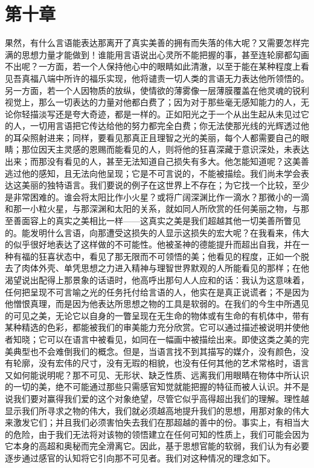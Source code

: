 
\section{第十章}

果然，有什么言语能表达那离开了真实美善的拥有而失落的伟大呢？又需要怎样完满的思想力量才能做到！谁能用言语说出心灵所不能把握的事，甚至连轮廓都勾画不出呢？一方面，若一个人保持他心中的眼睛如此清澈，以至于能在某种程度上看见吾真福八端中所许的福乐实现，他将谴责一切人类的言语无力表达他所领悟的。另一方面，若一个人因物质的放纵，使情欲的薄雾像一层薄膜覆盖在他灵魂的锐利视觉上，那么一切表达的力量对他都白费了；因为对于那些毫无感知能力的人，无论你轻描淡写还是夸大奇迹，都是一样的。正如阳光之于一个从出生起从未见过它的人，一切用言语把它传达给他的努力都完全白费；你无法使那光线的光辉透过他的耳朵照射进来；同样，要看见那真正且理智之光的美丽，每个人都需要自己的眼睛；那位因天主灵感的恩赐而能看见的人，则将他的狂喜深藏于意识深处，未表达出来；而那没有看见的人，甚至无法知道自己损失有多大。他怎能知道呢？这美善逃过他的感知，且无法向他呈现；它是不可言说的，不能被描绘。我们尚未学会表达这美丽的独特语言。我们要说的例子在这世界上不存在；为它找一个比较，至少是非常困难的。谁会将太阳比作小火星？或将广阔深渊比作一滴水？那微小的一滴和那一小粒火星，与那深渊和太阳的关系，就如同人所欣赏的任何美丽之物，与那至善面容上的真实之美相比一样——这真实之美是我们超越其他一切美善所瞥见的。能发明什么言语，向那遭受这损失的人显示这损失的宏大呢？在我看来，伟大的似乎很好地表达了这样做的不可能性。他被圣神的德能提升而超出自我，并在一种有福的狂喜状态中，看见了那无限而不可领悟的美；他看见的程度，正如一个脱去了肉体外壳、单凭思想之力进入精神与理智世界默观的人所能看见的那样；在他渴望说出配得上那景象的话语时，他高呼出那句人人应和的话：我认为这意味着，任何把呈现不可言喻之光的任务托付给言语的人，他实在是真正说谎者；不是因为他憎恨真理，而是因为他表达所思想之物的工具是软弱的。在我们的今生中所遇见的可见之美，无论它以自身的一瞥呈现在无生命的物体或有生命的有机体中，带有某种精选的色彩，都能被我们的审美能力充分欣赏。它可以通过描述被说明并使他者知晓；它可以在语言中被看见，如同在一幅画中被描绘出来。即使这类之美的完美典型也不会难倒我们的概念。但是，当语言找不到其描写的媒介，没有颜色，没有轮廓，没有宏伟的尺寸，没有无瑕的相貌，也没有任何其他的艺术常格时，语言又如何能说明呢？那不可见、无形状、缺乏性质、远离我们用眼睛在物体中所认识的一切的美，绝不可能通过那些只需感官知觉就能把握的特征而被人认识。并不是说我们要对赢得我们爱的这个对象绝望，尽管它似乎高得超出我们的理解。理性越显示我们所寻求之物的伟大，我们就必须越高地提升我们的思想，用那对象的伟大来激发它们；并且我们必须害怕失去我们在那超越的善中的份。事实上，有相当大的危险，由于我们无法将对该物的领悟建立在任何可知的性质上，我们可能会因为它本身的高超和奥秘而完全滑离它。因此，基于思想官能的软弱，我们认为有必要逐步通过感官的认知将它引向那不可见者。我们对这种情况的理念如下。\par


